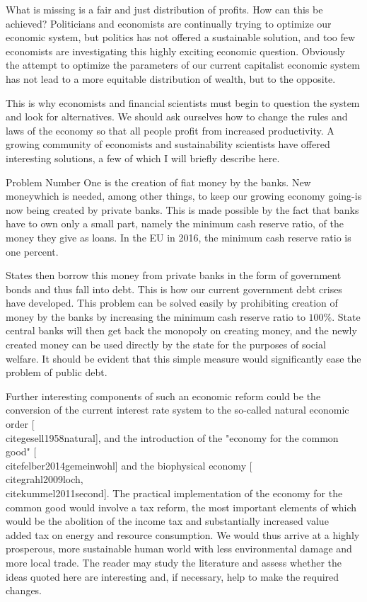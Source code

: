 \documentclass[10pt]{book}
\begin{document}
What is missing is a fair and just distribution of profits. How can this be achieved? Politicians and economists are continually trying to optimize our economic system, but politics has not offered a sustainable solution, and too few economists are investigating this highly exciting economic question. Obviously the attempt to optimize the parameters of our current capitalist economic system has not lead to a more equitable distribution of wealth, but to the opposite.

This is why economists and financial scientists must begin to question the system and look for alternatives. We should ask ourselves how to change the rules and laws of the economy so that all people profit from increased productivity. A growing community of economists and sustainability scientists have offered interesting solutions, a few of which I will briefly describe here.

Problem Number One is the creation of fiat money by the banks. New moneywhich is needed, among other things, to keep our growing economy going-is now being created by private banks. This is made possible by the fact that banks have to own only a small part, namely the minimum cash reserve ratio, of the money they give as loans. In the EU in 2016, the minimum cash reserve ratio is one percent.

States then borrow this money from private banks in the form of government bonds and thus fall into debt. This is how our current government debt crises have developed. This problem can be solved easily by prohibiting creation of money by the banks by increasing the minimum cash reserve ratio to $100 \%$. State central banks will then get back the monopoly on creating money, and the newly created money can be used directly by the state for the purposes of social welfare. It should be evident that this simple measure would significantly ease the problem of public debt.

Further interesting components of such an economic reform could be the conversion of the current interest rate system to the so-called natural economic order [\\cite{gesell1958natural}], and the introduction of the "economy for the common good" [\\cite{felber2014gemeinwohl}] and the biophysical economy [\\cite{grahl2009loch}, \\cite{kummel2011second}]. The practical implementation of the economy for the common good would involve a tax reform, the most important elements of which would be the abolition of the income tax and substantially increased value\\
added tax on energy and resource consumption. We would thus arrive at a highly prosperous, more sustainable human world with less environmental damage and more local trade. The reader may study the literature and assess whether the ideas quoted here are interesting and, if necessary, help to make the required changes.
\end{document}
